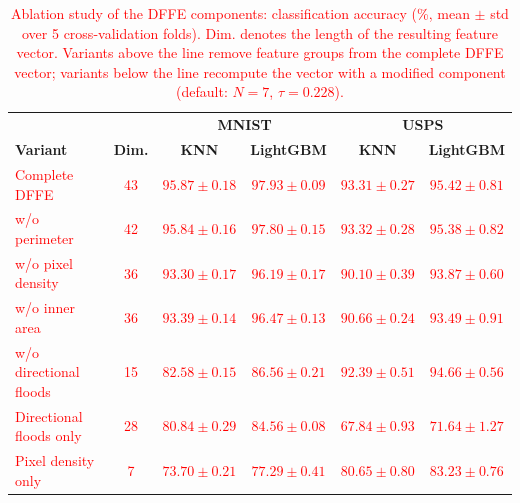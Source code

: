 \documentclass[a4paper,fleqn]{cas-dc}
\begin{document}
\begin{table}
    \centering
    \caption{\textcolor{red}{Ablation study of the DFFE components: classification accuracy (\%, mean $\pm$ std over 5 cross-validation folds). Dim. denotes the length of the resulting feature vector. Variants above the line remove feature groups from the complete DFFE vector; variants below the line recompute the vector with a modified component (default: $N = 7$, $\tau = 0.228$).}}
    \label{tab:ablation}
    \begin{tabular}{l|c|cc|cc}
        \hline
        & & \multicolumn{2}{c|}{\textbf{MNIST}} & \multicolumn{2}{c}{\textbf{USPS}} \\
        \textbf{Variant} & \textbf{Dim.} & \textbf{KNN} & \textbf{LightGBM} & \textbf{KNN} & \textbf{LightGBM} \\
        \hline
        \textcolor{red}{Complete DFFE} & \textcolor{red}{43} & \textcolor{red}{$95.87 \pm 0.18$} & \textcolor{red}{$97.93 \pm 0.09$} & \textcolor{red}{$93.31 \pm 0.27$} & \textcolor{red}{$95.42 \pm 0.81$} \\
        \textcolor{red}{w/o perimeter} & \textcolor{red}{42} & \textcolor{red}{$95.84 \pm 0.16$} & \textcolor{red}{$97.80 \pm 0.15$} & \textcolor{red}{$93.32 \pm 0.28$} & \textcolor{red}{$95.38 \pm 0.82$} \\
        \textcolor{red}{w/o pixel density} & \textcolor{red}{36} & \textcolor{red}{$93.30 \pm 0.17$} & \textcolor{red}{$96.19 \pm 0.17$} & \textcolor{red}{$90.10 \pm 0.39$} & \textcolor{red}{$93.87 \pm 0.60$} \\
        \textcolor{red}{w/o inner area} & \textcolor{red}{36} & \textcolor{red}{$93.39 \pm 0.14$} & \textcolor{red}{$96.47 \pm 0.13$} & \textcolor{red}{$90.66 \pm 0.24$} & \textcolor{red}{$93.49 \pm 0.91$} \\
        \textcolor{red}{w/o directional floods} & \textcolor{red}{15} & \textcolor{red}{$82.58 \pm 0.15$} & \textcolor{red}{$86.56 \pm 0.21$} & \textcolor{red}{$92.39 \pm 0.51$} & \textcolor{red}{$94.66 \pm 0.56$} \\
        \textcolor{red}{Directional floods only} & \textcolor{red}{28} & \textcolor{red}{$80.84 \pm 0.29$} & \textcolor{red}{$84.56 \pm 0.08$} & \textcolor{red}{$67.84 \pm 0.93$} & \textcolor{red}{$71.64 \pm 1.27$} \\
        \textcolor{red}{Pixel density only} & \textcolor{red}{7} & \textcolor{red}{$73.70 \pm 0.21$} & \textcolor{red}{$77.29 \pm 0.41$} & \textcolor{red}{$80.65 \pm 0.80$} & \textcolor{red}{$83.23 \pm 0.76$} \\

\end{tabular}
\end{table}
\end{document}
